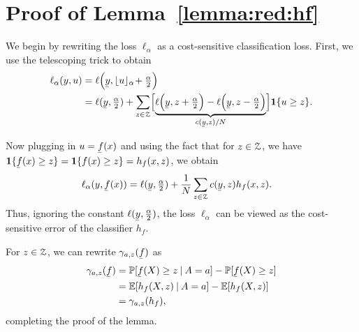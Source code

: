 \newpage
\onecolumn

\section{Proof of Lemma~\ref{lemma:red:hf}}

We begin by rewriting the loss $\ell_\alpha$ as a cost-sensitive classification loss. First, we use the telescoping trick to obtain
%
\begin{align*}
\ell_{\alpha}(y,u)
&
 =\ell\BigParens{\undery,\floors{u}_\alpha\!+\tfrac{\alpha}{2}}
\\
&
=\ell(\undery,\tfrac{\alpha}{2})
    +\sum_{z\in\calZ}
     \BigBracks{
     \underbrace{\ell\BigParens{\undery,z+\tfrac{\alpha}{2}}-\ell\BigParens{\undery,z-\tfrac{\alpha}{2}}
     }_{c(\undery,z)/N}
     }
     \ind\braces{u\ge z}.
\end{align*}

Now plugging in $u=\underf(x)$ and using the fact that for $z\in\mathcal{Z}$, we have $\ind\set{\underf(x)\ge z}=\ind\set{f(x)\ge z}=h_f(x,z)$, we obtain
%
\begin{align}
\label{eq:loss:hf}
  \ell_\alpha(y,\underf(x))
&
  =\ell(\undery,\tfrac{\alpha}{2})+\frac{1}{N}\sum_{z\in\calZ} c(\undery,z)h_f(x,z).
\end{align}
%
Thus, ignoring the constant $\ell(\undery,\tfrac{\alpha}{2})$, the loss $\ell_\alpha$ can be viewed as the cost-sensitive error of the classifier $h_f$.

For $z\in\mathcal{Z}$, we can rewrite $\gamma_{a,z}(\underf)$ as
%
\begin{align}
\notag
\gamma_{a,z}(\underf)
  &= \P[\underf(X)\ge z\given A=a] - \P[\underf(X)\ge z]
\\
\label{eq:gamma:hf}
  &= \E[h_f(X,z)\given A=a] - \E[h_f(X,z)]
\\
\notag
  &=\gamma_{a,z}(h_f),
\end{align}
%
completing the proof of the lemma.

